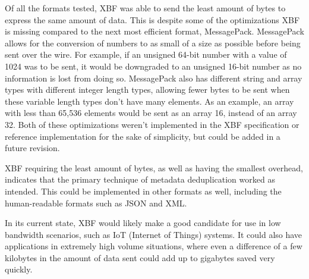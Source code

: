 \documentclass[conference]{IEEEtran}
\begin{document}
Of all the formats tested, XBF was able to send the least amount of bytes to express the same amount of data. This is despite some of the optimizations XBF is missing compared to the next most efficient format, MessagePack. MessagePack allows for the conversion of numbers to as small of a size as possible before being sent over the wire. For example, if an unsigned 64-bit number with a value of 1024 was to be sent, it would be downgraded to an unsigned 16-bit number as no information is lost from doing so. MessagePack also has different string and array types with different integer length types, allowing fewer bytes to be sent when these variable length types don't have many elements. As an example, an array with less than 65,536 elements would be sent as an array 16, instead of an array 32. Both of these optimizations weren't implemented in the XBF specification or reference implementation for the sake of simplicity, but could be added in a future revision.

XBF requiring the least amount of bytes, as well as having the smallest overhead, indicates that the primary technique of metadata deduplication worked as intended. This could be implemented in other formats as well, including the human-readable formats such as JSON and XML.

In its current state, XBF would likely make a good candidate for use in low bandwidth scenarios, such as IoT (Internet of Things) systems. It could also have applications in extremely high volume situations, where even a difference of a few kilobytes in the amount of data sent could add up to gigabytes saved very quickly.



\end{document}
